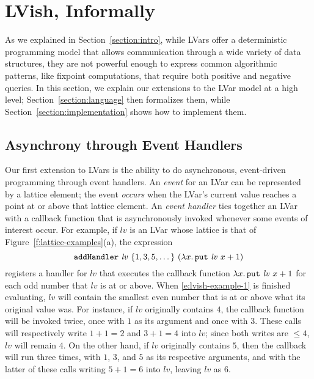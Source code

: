 \section{LVish, Informally}\label{section:lvish-informal}

As we explained in Section~\ref{section:intro}, while LVars offer a deterministic
programming model that allows communication through a wide variety of data structures,
they are not powerful enough to express common algorithmic patterns, like fixpoint
computations, that require both positive and negative queries.  In this section,
we explain our extensions to the LVar model at a high level;
Section~\ref{section:language} then formalizes them, while
Section~\ref{section:implementation} shows how to implement them.

\subsection{Asynchrony through Event Handlers}

Our first extension to LVars is the ability to do asynchronous, event-driven
programming through event handlers.  An \emph{event} for an LVar can be
represented by a lattice element; the event \emph{occurs} when the LVar's
current value reaches a point at or above that lattice element.  An \emph{event handler} ties
together an LVar with a callback function that is asynchronously invoked
whenever some events of interest occur.  For example, if $\mathit{lv}$ is an LVar
whose lattice is that of Figure~\ref{f:lattice-examples}(a), the expression
\begin{equation}
  {\mbox{\texttt{addHandler}}}~\mathit{lv}~\{ 1, 3, 5, \dots \}~(\lambda x.\,\mbox{\texttt{put}}~\mathit{lv}~x+1)
\label{e:lvish-example-1}
\end{equation}
registers a handler for $\mathit{lv}$ that executes the callback
function $\lambda x.\,\mbox{\texttt{put}}~\mathit{lv}~x+1$ for each odd number that
$\mathit{lv}$ is at or above.  When \ref{e:lvish-example-1} is
finished evaluating, $\mathit{lv}$ will contain the smallest even
number that is at or above what its original value was.  For instance,
if $\mathit{lv}$ originally contains $4$, the callback function will
be invoked twice, once with $1$ as its argument and once with $3$.
These calls will respectively write $1+1 = 2$ and $3+1 = 4$ into
$\mathit{lv}$; since both writes are $\leq 4$, $\mathit{lv}$ will
remain $4$.  On the other hand, if $\mathit{lv}$ originally contains
$5$, then the callback will run three times, with $1$, $3$, and $5$ as
its respective arguments, and with the latter of these calls writing
$5+1 = 6$ into $\mathit{lv}$, leaving $\mathit{lv}$ as $6$.

